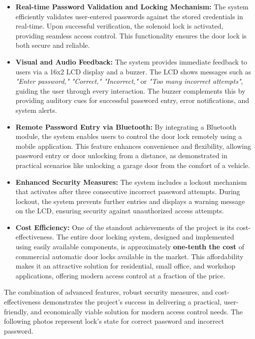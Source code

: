 \documentclass[a4paper, 12pt]{article}
\begin{document}
\begin{itemize}
    \item \textbf{Real-time Password Validation and Locking Mechanism:} 
    The system efficiently validates user-entered passwords against the stored credentials in real-time. Upon successful verification, the solenoid lock is activated, providing seamless access control. This functionality ensures the door lock is both secure and reliable.

    \item \textbf{Visual and Audio Feedback:} 
    The system provides immediate feedback to users via a 16x2 LCD display and a buzzer. The LCD shows messages such as \textit{"Enter password," "Correct," "Incorrect,"} or \textit{"Too many incorrect attempts"}, guiding the user through every interaction. The buzzer complements this by providing auditory cues for successful password entry, error notifications, and system alerts.

    \item \textbf{Remote Password Entry via Bluetooth:} 
    By integrating a Bluetooth module, the system enables users to control the door lock remotely using a mobile application. This feature enhances convenience and flexibility, allowing password entry or door unlocking from a distance, as demonstrated in practical scenarios like unlocking a garage door from the comfort of a vehicle.

    \item \textbf{Enhanced Security Measures:} 
    The system includes a lockout mechanism that activates after three consecutive incorrect password attempts. During lockout, the system prevents further entries and displays a warning message on the LCD, ensuring security against unauthorized access attempts.

    \item \textbf{Cost Efficiency:} 
    One of the standout achievements of the project is its cost-effectiveness. The entire door locking system, designed and implemented using easily available components, is approximately \textbf{one-tenth the cost} of commercial automatic door locks available in the market. This affordability makes it an attractive solution for residential, small office, and workshop applications, offering modern access control at a fraction of the price.
\end{itemize}

The combination of advanced features, robust security measures, and cost-effectiveness demonstrates the project's success in delivering a practical, user-friendly, and economically viable solution for modern access control needs.
The following photos represent lock's state for correct password and incorrect password.
\end{document}
